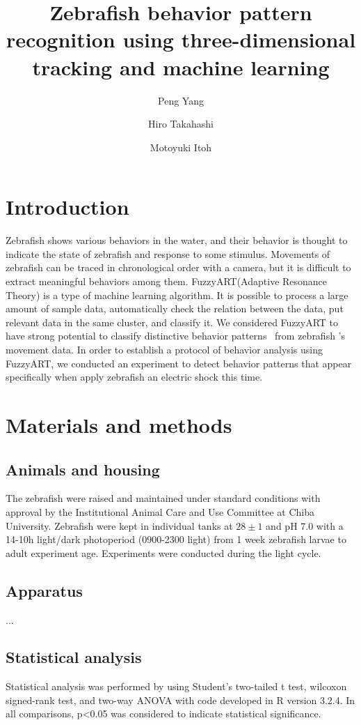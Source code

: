 \documentclass[fleqn,10pt]{wlscirep}
\title{Zebrafish behavior pattern recognition using three-dimensional tracking and machine learning}
\author[1]{Peng Yang}
\author[2]{Hiro Takahashi}
\author[1,*]{Motoyuki Itoh}
\affil[1]{Graduate School of Pharmaceutical Science, Chiba University, Chiba, Japan}
\affil[2]{Graduate School of Medical Sciences, Kanazawa University, Chiba, Japan}
\affil[*]{e-mail: mito@chiba-u.jp}
\begin{document}
\flushbottom
\maketitle

\thispagestyle{empty}

\section*{Introduction}

Zebrafish shows various behaviors in the water, and their behavior is thought to indicate the state of zebrafish and response to some stimulus. Movements of zebrafish can be traced in chronological order with a camera, but it is difficult to extract meaningful behaviors among them.
FuzzyART(Adaptive Resonance Theory) is a type of machine learning algorithm. It is possible to process a large amount of sample data, automatically check the relation between the data, put relevant data in the same cluster, and classify it. We considered FuzzyART to have strong potential to classify distinctive behavior patterns  from zebrafish 's movement data.
In order to establish a protocol of behavior analysis using FuzzyART, we conducted an experiment to detect behavior patterns that appear specifically when apply zebrafish an electric shock this time.



\section*{Materials and methods}

\subsection*{Animals and housing}

The zebrafish were raised and maintained under standard conditions with approval by the Institutional Animal Care and Use Committee at Chiba University. Zebrafish were kept in individual tanks at $28\pm1$ and pH 7.0 with a 14-10h light/dark photoperiod (0900-2300 light) from 1 week zebrafish larvae to adult experiment age. Experiments were conducted during the light cycle.

\subsection*{Apparatus}
...

\subsection*{Statistical analysis}
Statistical analysis was performed by using Student’s two-tailed t test, wilcoxon signed-rank test, and two-way ANOVA with code developed in R version 3.2.4. In all comparisons, p\textless0.05 was considered to indicate statistical significance. 
\end{document}
